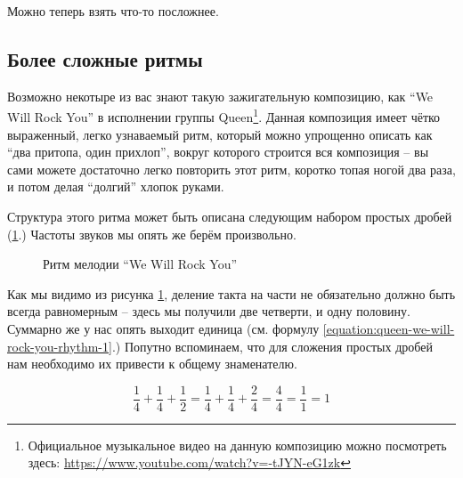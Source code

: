 \documentclass[a4paper,twoside]{book}
\begin{document}
Можно теперь взять что-то посложнее.

\subsection{Более сложные ритмы}

Возможно некотыре из вас знают такую зажигательную композицию, как ``We Will
Rock You'' в исполнении группы Queen\footnote{Официальное музыкальное видео на
данную композицию можно посмотреть здесь:
\url{https://www.youtube.com/watch?v=-tJYN-eG1zk}}. Данная композиция имеет
чётко выраженный, легко узнаваемый ритм, который можно упрощенно описать как
``два притопа, один прихлоп'', вокруг которого строится вся композиция -- вы сами
можете достаточно легко повторить этот ритм, коротко топая ногой два раза, и
потом делая ``долгий'' хлопок руками.

Структура этого ритма может быть описана следующим набором простых дробей
(\ref{fig:queen-we-will-rock-you-rhythm-1}.) Частоты звуков мы опять же берём
произвольно.

\begin{figure}[ht]
  \label{fig:queen-we-will-rock-you-rhythm-1}
  \caption{Ритм мелодии ``We Will Rock You''}
\end{figure}

Как мы видимо из рисунка \ref{fig:queen-we-will-rock-you-rhythm-1}, деление
такта на части не обязательно должно быть всегда равномерным -- здесь мы получили
две четверти, и одну половину. Суммарно же у нас опять выходит единица (см.
формулу \ref{equation:queen-we-will-rock-you-rhythm-1}.) Попутно вспоминаем, что
для сложения простых дробей нам необходимо их привести к общему знаменателю.

\begin{equation}
  \label{equation:queen-we-will-rock-you-rhythm-1}
  \frac{1}{4} + \frac{1}{4} + \frac{1}{2} = \frac{1}{4} + \frac{1}{4} + \frac{2}{4} = \frac{4}{4} = \frac{1}{1} = 1
\end{equation}
\end{document}
